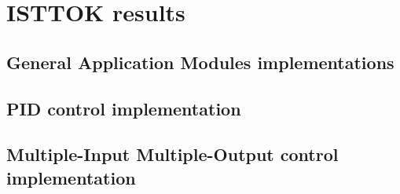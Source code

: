 \chapter{ISTTOK  results }

\section{General Application Modules  implementations}
\section{PID control implementation}
\section{Multiple-Input Multiple-Output control implementation}